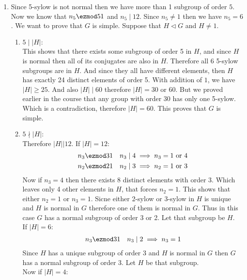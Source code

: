 \begin{enumerate}[label=\ilabel]
    \item 
        Since 5-sylow is not normal then we have more than 1 subgroup of order $5$. Now we know that $n_5 \ezmod 5 1$ and $n_5 \mid 12$. Since $n_5 \ne 1$ then we have $n_5 = 6$. We want to prove that $G$ is simple. Suppose that $H \lhd G$ and $H \ne 1$.
        \begin{enumerate}[label=Case \arabic*)]
            \item $5 \mid |H|$: \\
                This shows that there exists some subgroup of order 5 in $H$, and since $H$ is normal then all of its conjugates are also in $H$. Therefore all 6 5-sylow subgroups are in $H$. And since they all have different elements, then $H$ has exactly 24 distinct elements of order 5. With addition of $1$, we have $|H| \ge 25$. And also $|H| \mid 60$ therefore $|H| = 30$ or $60$. But we proved earlier in the course that any group with order 30 has only one 5-sylow. Which is a contradiction, therefore $|H| = 60$. This proves that $G$ is simple.
            \item $5 \nmid |H|$:\\
                Therefore $|H| \big| 12$. If $|H| = 12$:
                \begin{gather*}
                    n_3 \ezmod 3 1 \ \ \  n_3 \mid 4 \implies n_3 = 1 \text{ or } 4 \\
                    n_2 \ezmod 2 1 \ \ \  n_2 \mid 3 \implies n_2 = 1 \text{ or } 3
                \end{gather*}
                Now if $n_3 = 4$ then there exists 8 distinct elements with order 3. Which leaves only 4 other elements in $H$, that forces $n_2 = 1$. This shows that either $n_2 = 1$ or $n_3 = 1$. Sicne either 2-sylow or 3-sylow in $H$ is unique and $H$ is normal in $G$ therefore one of them is normal in $G$. Thus in this case $G$ has a normal subgroup of order 3 or 2. Let that subgroup be $H$.\\
                If $|H| = 6$:
                \begin{gather*}
                    n_3 \ezmod 3 1 \ \ \ n_3 \mid 2 \implies n_3 = 1
                \end{gather*}
                Since $H$ has a unique subgroup of order 3 and $H$ is normal in $G$ then $G$ has a normal subgroup of order 3. Let $H$ be that subgroup.\\
                Now if $|H| = 4$:
                \begin{gather*}

\end{gather*}
\end{enumerate}
\end{enumerate}

